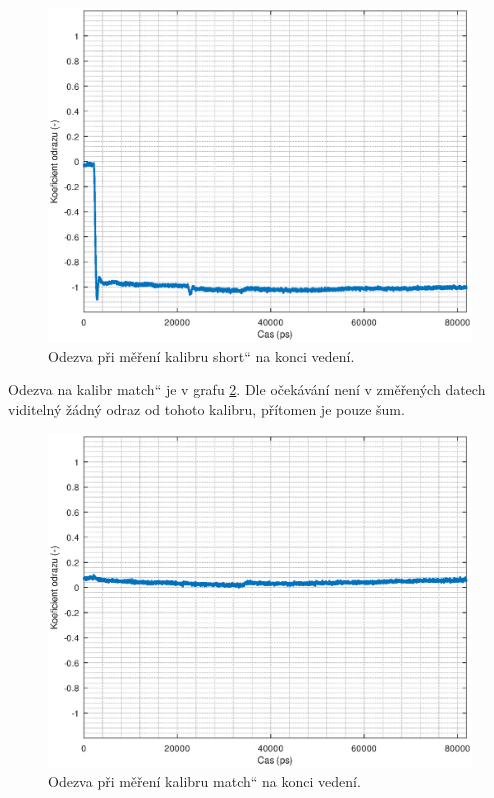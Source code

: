 \begin{figure}[htbp]
\includegraphics[width=\textwidth,keepaspectratio]{images/self-measurements/measured_short.eps}\caption{Odezva při měření kalibru \quotedblbase short\textquotedblleft{} na konci vedení.}\label{measured_short}
\end{figure}

Odezva na kalibr \quotedblbase match\textquotedblleft{} je v grafu \ref{measured_load}. Dle očekávání není v změřených datech viditelný žádný odraz od tohoto kalibru, přítomen je pouze šum.

\begin{figure}[htbp]
\includegraphics[width=\textwidth,keepaspectratio]{images/self-measurements/measured_load.eps}\caption{Odezva při měření kalibru \quotedblbase match\textquotedblleft{} na konci vedení.}\label{measured_load}
\end{figure}

